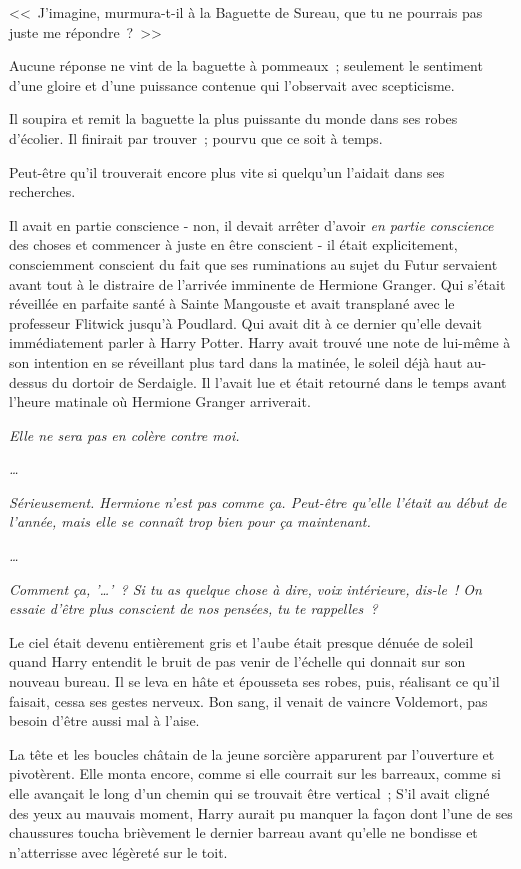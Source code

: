 <<~J'imagine, murmura-t-il à la Baguette de Sureau, que tu ne pourrais pas juste me répondre~?~>>

Aucune réponse ne vint de la baguette à pommeaux~; seulement le sentiment d'une gloire et d'une puissance contenue qui l'observait avec scepticisme.

Il soupira et remit la baguette la plus puissante du monde dans ses robes d'écolier. Il finirait par trouver~; pourvu que ce soit à temps.

Peut-être qu'il trouverait encore plus vite si quelqu'un l'aidait dans ses recherches.

Il avait en partie conscience - non, il devait arrêter d'avoir \emph{en partie conscience} des choses et commencer à juste en être conscient - il était explicitement, consciemment conscient du fait que ses ruminations au sujet du Futur servaient avant tout à le distraire de l'arrivée imminente de Hermione Granger. Qui s'était réveillée en parfaite santé à Sainte Mangouste et avait transplané avec le professeur Flitwick jusqu'à Poudlard. Qui avait dit à ce dernier qu'elle devait immédiatement parler à Harry Potter. Harry avait trouvé une note de lui-même à son intention en se réveillant plus tard dans la matinée, le soleil déjà haut au-dessus du dortoir de Serdaigle. Il l'avait lue et était retourné dans le temps avant l'heure matinale où Hermione Granger arriverait.

\emph{Elle ne sera pas en colère contre moi.}

\emph{…}

\emph{Sérieusement. Hermione n'est pas comme ça. Peut-être qu'elle l'était au début de l'année, mais elle se connaît trop bien pour ça maintenant.}

\emph{…}

\emph{Comment ça, '…'~? Si tu as quelque chose à dire, voix intérieure, dis-le~! On essaie d'être plus conscient de nos pensées, tu te rappelles~?}

\later

Le ciel était devenu entièrement gris et l'aube était presque dénuée de soleil quand Harry entendit le bruit de pas venir de l'échelle qui donnait sur son nouveau bureau. Il se leva en hâte et épousseta ses robes, puis, réalisant ce qu'il faisait, cessa ses gestes nerveux. Bon sang, il venait de vaincre Voldemort, pas besoin d'être aussi mal à l'aise.

La tête et les boucles châtain de la jeune sorcière apparurent par l'ouverture et pivotèrent. Elle monta encore, comme si elle courrait sur les barreaux, comme si elle avançait le long d'un chemin qui se trouvait être vertical~; S'il avait cligné des yeux au mauvais moment, Harry aurait pu manquer la façon dont l'une de ses chaussures toucha brièvement le dernier barreau avant qu'elle ne bondisse et n'atterrisse avec légèreté sur le toit.

